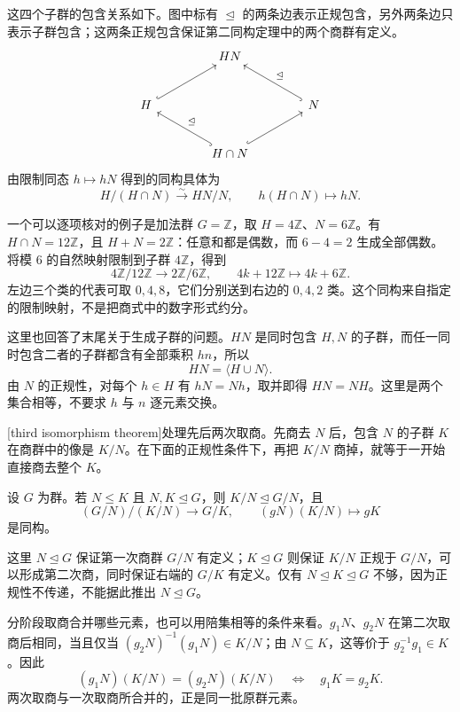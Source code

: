 这四个子群的包含关系如下。图中标有 \(\trianglelefteq\) 的两条边表示正规包含，另外两条边只表示子群包含；这两条正规包含保证第二同构定理中的两个商群有定义。
\[
	\begin{tikzcd}[column sep=4em,row sep=2.5em]
		& HN & \\
		H \arrow[ur,hook] && N \arrow[ul,hook,"\trianglelefteq"'] \\
		& H\cap N \arrow[ul,hook,"\trianglelefteq"'] \arrow[ur,hook] &
	\end{tikzcd}
\]
由限制同态 \(h\mapsto hN\) 得到的同构具体为
\[
	H/(H\cap N)\xrightarrow{\sim}HN/N, \qquad h(H\cap N)\longmapsto hN.
\]

一个可以逐项核对的例子是加法群 \(G=\mathbb Z\)，取 \(H=4\mathbb Z\)、\(N=6\mathbb Z\)。有 \(H\cap N=12\mathbb Z\)，且 \(H+N=2\mathbb Z\)：任意和都是偶数，而 \(6-4=2\) 生成全部偶数。将模 \(6\) 的自然映射限制到子群 \(4\mathbb Z\)，得到
\[
	4\mathbb Z/12\mathbb Z\longrightarrow2\mathbb Z/6\mathbb Z, \qquad4k+12\mathbb Z\longmapsto4k+6\mathbb Z.
\]
左边三个类的代表可取 \(0,4,8\)，它们分别送到右边的 \(0,4,2\) 类。这个同构来自指定的限制映射，不是把商式中的数字形式约分。

\ProseParagraphBreak
这里也回答了末尾关于生成子群的问题。\(HN\) 是同时包含 \(H,N\) 的子群，而任一同时包含二者的子群都含有全部乘积 \(hn\)，所以
\[
	HN=\langle H\cup N\rangle.
\]
由 \(N\) 的正规性，对每个 \(h\in H\) 有 \(hN=Nh\)，取并即得 \(HN=NH\)。这里是两个集合相等，不要求 \(h\) 与 \(n\) 逐元素交换。

\ProseParagraphBreak
{}[third isomorphism theorem]处理先后两次取商。先商去 \(N\) 后，包含 \(N\) 的子群 \(K\) 在商群中的像是 \(K/N\)。在下面的正规性条件下，再把 \(K/N\) 商掉，就等于一开始直接商去整个 \(K\)。
\begin{theorem}[第三同构定理]\label{b1:thm:third-isomorphism}
	设 \(G\) 为群。若 \(N\leq K\) 且 \(N,K\trianglelefteq G\)，则 \(K/N\trianglelefteq G/N\)，且
	\[
		(G/N)/(K/N)\longrightarrow G/K,\qquad (gN)(K/N)\longmapsto gK
	\]
	是同构。
\end{theorem}

这里 \(N\trianglelefteq G\) 保证第一次商群 \(G/N\) 有定义；\(K\trianglelefteq G\) 则保证 \(K/N\) 正规于 \(G/N\)，可以形成第二次商，同时保证右端的 \(G/K\) 有定义。仅有 \(N\trianglelefteq K\trianglelefteq G\) 不够，因为正规性不传递，不能据此推出 \(N\trianglelefteq G\)。

\ProseParagraphBreak
分阶段取商合并哪些元素，也可以用陪集相等的条件来看。\(g_1N\)、\(g_2N\) 在第二次取商后相同，当且仅当 \((g_2N)^{-1}(g_1N)\in K/N\)；由 \(N\subseteq K\)，这等价于 \(g_2^{-1}g_1\in K\)。因此
\[
	(g_1N)(K/N)=(g_2N)(K/N) \quad\Longleftrightarrow\quad g_1K=g_2K.
\]
两次取商与一次取商所合并的，正是同一批原群元素。

